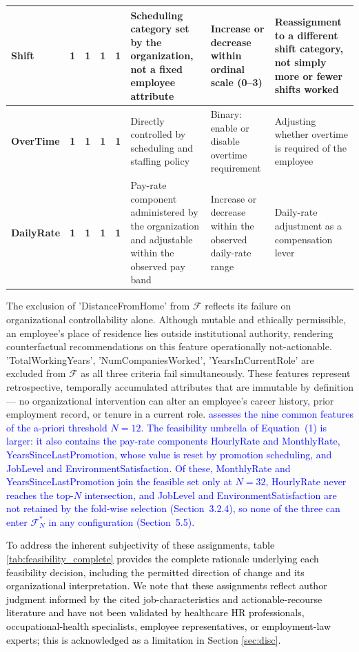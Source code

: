 \documentclass[a4paper,fleqn]{cas-sc}
\begin{document}
\begin{table}[width=1\linewidth, pos=H]
\begin{tabular}{p{3cm}ccccp{3.25cm}p{2.7cm}p{3.25cm}}
\textbf{Shift} & \textbf{1} & \textbf{1} & \textbf{1} & \textbf{1} &
Scheduling category set by the organization, not a fixed employee attribute &
Increase or decrease within ordinal scale (0--3) &
Reassignment to a different shift category, not simply more or fewer shifts worked \\
\midrule
\textbf{OverTime} & \textbf{1} & \textbf{1} & \textbf{1} & \textbf{1} &
Directly controlled by scheduling and staffing policy &
Binary: enable or disable overtime requirement &
Adjusting whether overtime is required of the employee \\
\midrule
\textbf{DailyRate} & \textbf{1} & \textbf{1} & \textbf{1} & \textbf{1} &
Pay-rate component administered by the organization and adjustable within the observed pay band &
Increase or decrease within the observed daily-rate range &
Daily-rate adjustment as a compensation lever \\
\bottomrule
\end{tabular}
\end{table}

The exclusion of 'DistanceFromHome' from $\mathcal{F}$ reflects its failure on organizational controllability alone. Although mutable and ethically permissible, an employee's place of residence lies outside institutional authority, rendering counterfactual recommendations on this feature operationally not-actionable.
'TotalWorkingYears', 'NumCompaniesWorked', 'YearsInCurrentRole' are excluded from $\mathcal{F}$ as all three criteria fail simultaneously. These features represent retrospective, temporally accumulated attributes that are immutable by definition — no organizational intervention can alter an employee's career history, prior employment record, or tenure in a current role. 
\textcolor{blue}{ assesses the nine common features of the a-priori threshold $N = 12$. The feasibility umbrella of Equation~(1) is larger: it also contains the pay-rate components HourlyRate and MonthlyRate, YearsSinceLastPromotion, whose value is reset by promotion scheduling, and JobLevel and EnvironmentSatisfaction. Of these, MonthlyRate and YearsSinceLastPromotion join the feasible set only at $N = 32$, HourlyRate never reaches the top-$N$ intersection, and JobLevel and EnvironmentSatisfaction are not retained by the fold-wise selection (Section~3.2.4), so none of the three can enter $\mathcal{F}^*_N$ in any configuration (Section~5.5).}

\textcolor{black}{To address the inherent subjectivity of these assignments, table \ref{tab:feasibility_complete} provides the complete rationale underlying each feasibility decision, including the permitted direction of change and its organizational interpretation. We note that these assignments reflect author judgment informed by the cited job-characteristics and actionable-recourse literature \cite{ustun2019actionable, karimi2021algorithmic, hackman1976motivation} and have not been validated by healthcare HR professionals, occupational-health specialists, employee representatives, or employment-law experts; this is acknowledged as a limitation in Section \ref{sec:disc}.}
\end{document}
